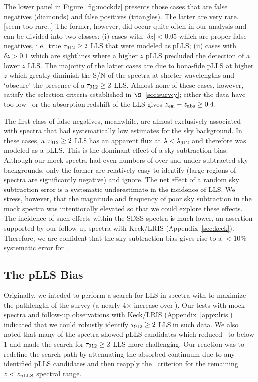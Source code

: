 \documentclass[12pt,preprint]{aastex}
\begin{document}
The lower panel in Figure~\ref{fig:mockdz} presents those cases
that are false negatives (diamonds) and false positives (triangles).
The latter are very rare. [seem too rare..]
The former, however, did occur quite often in our analysis and can
be divided into two classes:  
(i) cases with $|\delta z| < 0.05$ which are proper false negatives, i.e.\
true $\tau_{\rm 912} \ge 2$ LLS that were modeled as pLLS;
(ii) cases with $\delta z > 0.1$ which are sightlines where a
higher $z$ pLLS precluded the detection of a lower $z$ LLS.
The majority of the latter cases 
are due to bona-fide pLLS at higher $z$ which greatly diminish
the S/N of the spectra at shorter wavelengths and `obscure'
the presence of a $\tau_{\rm 912} \ge 2$ LLS.
Almost none of these cases, however, satisfy the selection
criteria established in $\S$~\ref{sec:survey};  either the
data have too low \sna\ or the absorption redshift of the LLS
gives $z_{\rm em} - z_{\rm abs} \ge 0.4$.  

The first class of false negatives, meanwhile,
are almost exclusively associated with spectra
that had systematically low estimates for the sky background.
In these cases, a $\tau_{\rm 912} \ge 2$ LLS has an apparent flux 
at $\lambda < \lambda_{\rm 912}$ and therefore was modeled as a pLLS.
This is the dominant effect of a sky subtraction bias.
Although our mock spectra had even numbers of over and under-subtracted
sky backgrounds, only the former
are relatively easy to identify (large
regions of spectra are significantly negative) and ignore.
The net effect of a random sky subtraction error is a 
systematic underestimate in the incidence of LLS.
We stress, however, that the magnitude and frequency of poor
sky subtraction in the mock spectra was intentionally elevated
so that we could explore these effects.  The incidence of
such effects within the SDSS spectra is much lower, an
assertion supported by our follow-up spectra with Keck/LRIS
(Appendix~\ref{sec:keck}).
Therefore, we are confident that the sky subtraction bias 
gives rise to a $<10\%$ systematic error for \lzlls.




\subsection{The pLLS Bias}
\label{sec:pLLS}

Originally, we inteded to perform a search for LLS in spectra
with  to maximize the pathlength of the survey 
(a nearly 4$\times$ increase over ).  Our
tests with mock spectra and follow-up observations with 
Keck/LRIS (Appendix~\ref{appx:lris}) indicated that we 
could robustly identify $\tau_{\rm 912} \ge 2$ LLS in such data.
We also noted that many of the spectra showed
pLLS candidates which reduced \sna\ to below 1 and made the
search for $\tau_{\rm 912} \ge 2$ LLS more challenging.  Our
reaction was to redefine the search path 
by attenuating the absorbed continuum due to
any identified pLLS candidates and then reapply
the \sna\ criterion for the remaining $z<z_{\rm pLLS}$
spectral range.
\end{document}
